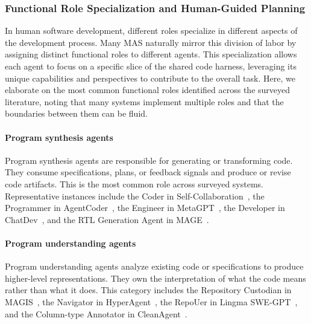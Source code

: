 \documentclass{llmxive}
\begin{document}
\subsubsection{Functional Role Specialization and Human-Guided Planning}
In human software development, different roles specialize in
different aspects of the development process. Many MAS naturally
mirror this division of labor by assigning distinct functional
roles to different agents. This specialization allows each agent
to focus on a specific slice of the shared code harness,
leveraging its unique capabilities and perspectives to contribute
to the overall task.
Here, we elaborate on the most common functional roles identified
across the surveyed literature, noting that many systems
implement multiple roles and that the boundaries between them can
be fluid.

\paragraph{Program synthesis agents} Program synthesis agents are
responsible for generating or transforming code. They consume
specifications, plans, or feedback signals and produce or revise
code artifacts. This is the most common role across surveyed
systems. Representative instances include the Coder in
Self-Collaboration~\cite{Dong2024SelfCollaboration}, the
Programmer in AgentCoder~\cite{huang2023agentcoder}, the Engineer
in MetaGPT~\cite{Hong2023MetaGPT}, the Developer in
ChatDev~\cite{Qian2023ChatDev}, and the RTL Generation Agent in
MAGE~\cite{Zhao2024MAGE}.

\paragraph{Program understanding agents} Program understanding
agents analyze existing code or specifications to produce
higher-level representations. They own the interpretation of what
the code means rather than what it does. This category includes
the Repository Custodian in MAGIS~\cite{Tao2024Magis}, the
Navigator in HyperAgent~\cite{Phan2024HyperAgent}, the RepoUer in
Lingma SWE-GPT~\cite{Ma2024Lingma}, and the Column-type Annotator
in CleanAgent~\cite{Qi2024CleanAgent}.
\end{document}
